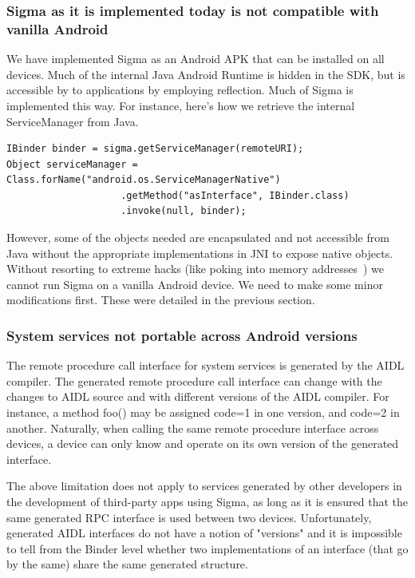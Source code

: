\documentclass[prodmode]{acmlarge}
\begin{document}
\subsubsection{Sigma as it is implemented today is not compatible with vanilla Android}
We have implemented Sigma as an Android APK that can be installed on all devices. Much of the internal Java Android Runtime is hidden in the SDK, but is accessible by to applications by employing reflection. Much of Sigma is implemented this way. For instance, here's how we retrieve the internal ServiceManager from Java.

\begin{Verbatim}[samepage=true]
IBinder binder = sigma.getServiceManager(remoteURI);
Object serviceManager = Class.forName("android.os.ServiceManagerNative")
                    .getMethod("asInterface", IBinder.class)
                    .invoke(null, binder);
\end{Verbatim}

However, some of the objects needed are encapsulated and not accessible from Java without the appropriate implementations in JNI to expose native objects. Without resorting to extreme hacks (like poking into memory addresses~\cite{FacebookDalvikHacks}) we cannot run Sigma on a vanilla Android device. We need to make some minor modifications first. These were detailed in the previous section.

\subsubsection{System services not portable across Android versions}
The remote procedure call interface for system services is generated by the AIDL compiler. The generated remote procedure call interface can change with the changes to AIDL source and with different versions of the AIDL compiler. For instance, a method foo() may be assigned code=1 in one version, and code=2 in another. Naturally, when calling the same remote procedure interface across devices, a device can only know and operate on its own version of the generated interface.

The above limitation does not apply to services generated by other developers in the development of third-party apps using Sigma, as long as it is ensured that the same generated RPC interface is used between two devices. Unfortunately, generated AIDL interfaces do not have a notion of "versions" and it is impossible to tell from the Binder level whether two implementations of an interface (that go by the same) share the same generated structure.
\end{document}
